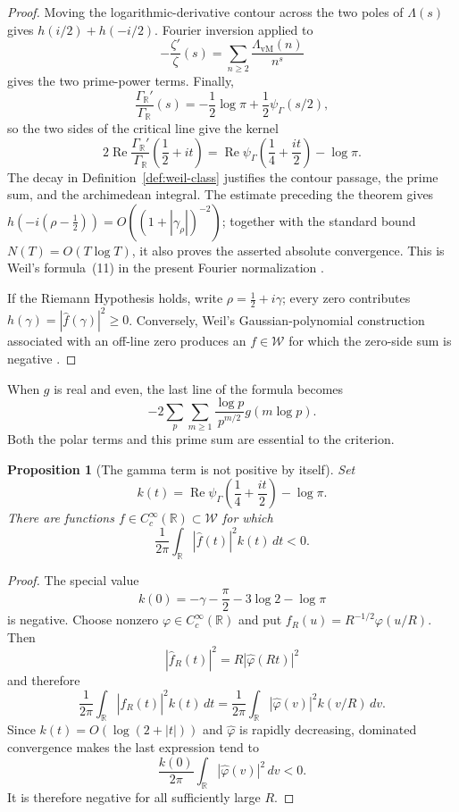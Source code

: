 \documentclass[11pt]{article}
\theoremstyle{plain}
\newtheorem{proposition}[theorem]{Proposition}
\theoremstyle{definition}
\theoremstyle{remark}
\newcommand{\GammaR}{\Gamma_{\mathbb R}}
\newcommand{\vmLambda}{\Lambda_{\mathrm{vM}}}
\newcommand{\psiGamma}{\psi_{\Gamma}}
\begin{document}
\begin{proof}
Moving the logarithmic-derivative contour across the two poles of
\(\Lambda(s)\) gives \(h(i/2)+h(-i/2)\).  Fourier inversion applied to
\[
 -\frac{\zeta'}{\zeta}(s)
 =\sum_{n\geq2}\frac{\vmLambda(n)}{n^s}
\]
gives the two prime-power terms.  Finally,
\[
 \frac{\GammaR'}{\GammaR}(s)
 =-\frac12\log\pi+\frac12\psiGamma(s/2),
\]
so the two sides of the critical line give the kernel
\[
 2\operatorname{Re}\frac{\GammaR'}{\GammaR}
 \left(\frac12+it\right)
 =\operatorname{Re}\psiGamma\!\left(\frac14+\frac{it}{2}\right)-\log\pi.
\]
The decay in Definition~\ref{def:weil-class} justifies the contour passage,
the prime sum, and the archimedean integral.  The estimate preceding the
theorem gives
\(h(-i(\rho-\tfrac12))=O((1+|\gamma_\rho|)^{-2})\); together with
the standard bound \(N(T)=O(T\log T)\), it also proves the asserted absolute
convergence.  This is Weil's formula~(11)
in the present Fourier normalization
\cite[pp.~259--260, formula~(11)]{Weil1952}.

If the Riemann Hypothesis holds, write
\(\rho=\tfrac12+i\gamma\); every zero contributes
\(h(\gamma)=|\widehat f(\gamma)|^2\geq0\).  Conversely, Weil's
Gaussian-polynomial construction associated with an off-line zero produces
an \(f\in\mathcal W\) for which the zero-side sum is negative
\cite[pp.~260--261, lemma following formula~(11)]{Weil1952}.
\end{proof}

When \(g\) is real and even, the last line of the formula becomes
\[
 -2\sum_p\sum_{m\geq1}\frac{\log p}{p^{m/2}}g(m\log p).
\]
Both the polar terms and this prime sum are essential to the criterion.

\begin{proposition}[The gamma term is not positive by itself]
\label{prop:gamma-negative}
Set
\[
 k(t)=\operatorname{Re}\psiGamma\!\left(\frac14+\frac{it}{2}\right)-\log\pi.
\]
There are functions \(f\in C_c^\infty(\mathbb R)\subset\mathcal W\) for
which
\[
 \frac1{2\pi}\int_{\mathbb R}|\widehat f(t)|^2k(t)\,dt<0.
\]
\end{proposition}

\begin{proof}
The special value
\[
 k(0)=-\gamma-\frac\pi2-3\log2-\log\pi
\]
is negative.  Choose nonzero \(\varphi\in C_c^\infty(\mathbb R)\) and put
\(f_R(u)=R^{-1/2}\varphi(u/R)\).  Then
\[
 |\widehat f_R(t)|^2=R|\widehat\varphi(Rt)|^2
\]
and therefore
\[
 \frac1{2\pi}\int_{\mathbb R}|\widehat f_R(t)|^2k(t)\,dt
 =\frac1{2\pi}\int_{\mathbb R}|\widehat\varphi(v)|^2k(v/R)\,dv.
\]
Since \(k(t)=O(\log(2+|t|))\) and \(\widehat\varphi\) is rapidly
decreasing, dominated convergence makes the last expression tend to
\[
 \frac{k(0)}{2\pi}
 \int_{\mathbb R}|\widehat\varphi(v)|^2\,dv<0.
\]
It is therefore negative for all sufficiently large \(R\).
\end{proof}
\end{document}
